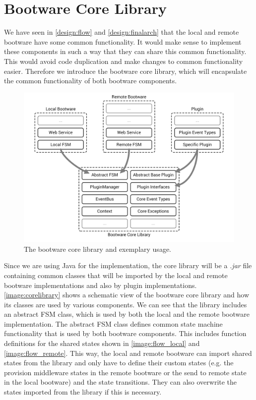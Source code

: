 \section{Bootware Core Library}

We have seen in \autoref{design:flow} and \autoref{design:finalarch} that the local and remote bootware have some common functionality.
It would make sense to implement these components in such a way that they can share this common functionality.
This would avoid code duplication and make changes to common functionality easier.
Therefore we introduce the bootware core library, which will encapsulate the common functionality of both bootware components.

\begin{figure}[!htbp]
	\centering
	\includegraphics[resolution=600]{implementation/assets/core_library}
	\caption{The bootware core library and exemplary usage.}
	\label{image:corelibrary}
\end{figure}

Since we are using Java for the implementation, the core library will be a \textit{.jar} file containing common classes that will be imported by the local and remote bootware implementations and also by plugin implementations.
\autoref{image:corelibrary} shows a schematic view of the bootware core library and how its classes are used by various components.
We can see that the library includes an abstract FSM class, which is used by both the local and the remote bootware implementation.
The abstract FSM class defines common state machine functionality that is used by both bootware components.
This includes function definitions for the shared states shown in \autoref{image:flow_local} and \autoref{image:flow_remote}.
This way, the local and remote bootware can import shared states from the library and only have to define their custom states (e.g. the provision middleware states in the remote bootware or the send to remote state in the local bootware) and the state transitions.
They can also overwrite the states imported from the library if this is necessary.

